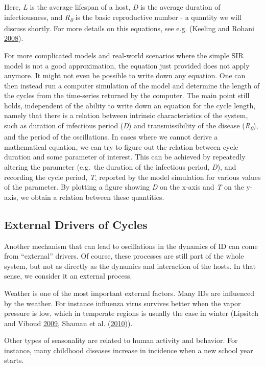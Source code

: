 \documentclass[]{article}
\theoremstyle{definition}
\theoremstyle{definition}
\theoremstyle{definition}
\theoremstyle{remark}
\begin{document}
Here, \emph{L} is the average lifespan of a host, \emph{D} is the
average duration of infectiousness, and \emph{R\textsubscript{0}} is the
basic reproductive number - a quantity we will discuss shortly. For more
details on this equations, see e.g. (Keeling and Rohani
\protect\hyperlink{ref-keeling08}{2008}).

For more complicated models and real-world scenarios where the simple
SIR model is not a good approximation, the equation just provided does
not apply anymore. It might not even be possible to write down any
equation. One can then instead run a computer simulation of the model
and determine the length of the cycles from the time-series returned by
the computer. The main point still holds, independent of the ability to
write down an equation for the cycle length, namely that there is a
relation between intrinsic characteristics of the system, such as
duration of infectious period (\emph{D}) and transmissibility of the
disease (\emph{R\textsubscript{0}}), and the period of the oscillations.
In cases where we cannot derive a mathematical equation, we can try to
figure out the relation between cycle duration and some parameter of
interest. This can be achieved by repeatedly altering the parameter
(e.g.~the duration of the infectious period, \emph{D}), and recording
the cycle period, \emph{T}, reported by the model simulation for various
values of the parameter. By plotting a figure showing \emph{D} on the
x-axis and \emph{T} on the y-axis, we obtain a relation between these
quantities.

\subsection{External Drivers of
Cycles}\label{external-drivers-of-cycles}

Another mechanism that can lead to oscillations in the dynamics of ID
can come from ``external'' drivers. Of course, these processes are still
part of the whole system, but not as directly as the dynamics and
interaction of the hosts. In that sense, we consider it an external
process.

Weather is one of the most important external factors. Many IDs are
influenced by the weather. For instance influenza virus survives better
when the vapor pressure is low, which in temperate regions is usually
the case in winter (Lipsitch and Viboud
\protect\hyperlink{ref-lipsitch09}{2009}, Shaman et al.
(\protect\hyperlink{ref-shaman10}{2010})).

Other types of seasonality are related to human activity and behavior.
For instance, many childhood diseases increase in incidence when a new
school year starts.
\end{document}
